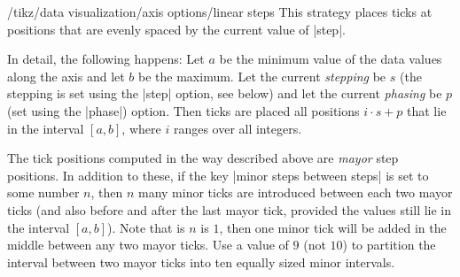 \begin{key}{/tikz/data visualization/axis options/linear steps}
  This strategy places ticks at positions that are evenly spaced by
  the current value of |step|.

  In detail, the following happens: Let $a$ be the minimum value of the
  data values along the axis and let $b$ be the maximum. Let the
  current \emph{stepping} be $s$ (the stepping is set using the |step|
  option, see below) and let the current \emph{phasing} be $p$ (set
  using the |phase|) option. Then ticks are placed all positions
  $i\cdot s + p$ that lie in the interval $[a,b]$, where $i$ ranges
  over all integers.

  The tick positions computed in the way described above are
  \emph{mayor} step positions. In addition to these, if the key
  |minor steps between steps| is set to some number $n$, then $n$ many
  minor ticks are introduced between each two mayor ticks (and also
  before and after the last mayor tick, provided the values still lie
  in the interval $[a,b]$). Note that is $n$ is $1$, then one minor tick
  will be added in the middle between any two mayor ticks. Use a value
  of $9$ (not $10$) to partition the interval between two mayor ticks
  into ten equally sized minor intervals.

\begin{codeexample}[]
\end{codeexample}
\end{key}

\label{section-dv-exponential-strategy}


